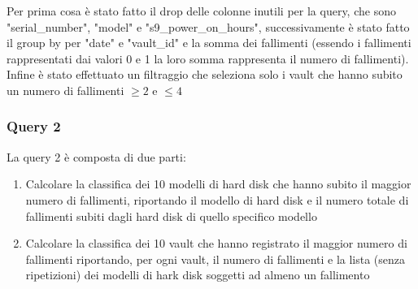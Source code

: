 \documentclass[conference]{IEEEtran}
\begin{document}
Per prima cosa è stato fatto il drop delle colonne inutili per la query, che sono "serial\_number", "model" e "s9\_power\_on\_hours", successivamente è stato fatto il group by per "date" e "vault\_id" e la somma dei fallimenti (essendo i fallimenti rappresentati dai valori 0 e 1 la loro somma rappresenta il numero di fallimenti). Infine è stato effettuato un filtraggio che seleziona solo i vault che hanno subito un numero di fallimenti $\geq2$ e $\leq4$ 

\subsubsection{Query 2}
La query 2 è composta di due parti:
\begin{enumerate}
    \item Calcolare la classifica dei 10 modelli di hard disk che hanno subito il maggior numero di fallimenti, riportando il modello di hard disk e il numero totale di fallimenti subiti dagli hard disk di quello specifico modello
    \item Calcolare la classifica dei 10 vault che hanno registrato il maggior numero di
    fallimenti riportando, per ogni vault, il numero di fallimenti e la lista (senza ripetizioni) dei modelli di
    hark disk soggetti ad almeno un fallimento
\end{enumerate}
\end{document}
